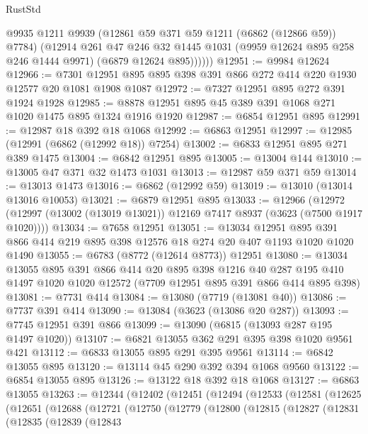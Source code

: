 \begin{lexlean}{RustStd}
\begin{coremodule}
            @9935
            @1211
            @9939
            (@12861 @59 @371 @59 @1211 (@6862 (@12866 @59)) @7784)
            (@12914
              @261
              @47
              @246
              @32
              @1445
              @1031
              (@9959 @12624 @895 @258 @246 @1444 @9971)
              (@6879 @12624 @895))))))
@12951 := @9984 @12624
@12966 := @7301 @12951 @895 @895 @398 @391 @866 @272 @414 @220 @1930 @12577 @20 @1081 @1908 @1087
@12972 := @7327 @12951 @895 @272 @391 @1924 @1928
@12985 := @8878 @12951 @895 @45 @389 @391 @1068 @271 @1020 @1475 @895 @1324 @1916 @1920
@12987 := @6854 @12951 @895
@12991 := @12987 @18 @392 @18 @1068
@12992 := @6863 @12951
@12997 := @12985 (@12991 (@6862 (@12992 @18)) @7254)
@13002 := @6833 @12951 @895 @271 @389 @1475
@13004 := @6842 @12951 @895
@13005 := @13004 @144
@13010 := @13005 @47 @371 @32 @1473 @1031
@13013 := @12987 @59 @371 @59
@13014 := @13013 @1473
@13016 := @6862 (@12992 @59)
@13019 := @13010 (@13014 @13016 @10053)
@13021 := @6879 @12951 @895
@13033 := @12966
    (@12972 (@12997 (@13002 (@13019 @13021)) @12169 @7417 @8937 (@3623 (@7500 @1917 @1020))))
@13034 := @7658 @12951
@13051 := @13034
    @12951
    @895
    @391
    @866
    @414
    @219
    @895
    @398
    @12576
    @18
    @274
    @20
    @407
    @1193
    @1020
    @1020
    @1490
@13055 := @6783 (@8772 (@12614 @8773)) @12951
@13080 := @13034
    @13055
    @895
    @391
    @866
    @414
    @20
    @895
    @398
    @1216
    @40
    @287
    @195
    @410
    @1497
    @1020
    @1020
    @12572
    (@7709 @12951 @895 @391 @866 @414 @895 @398)
@13081 := @7731 @414
@13084 := @13080 (@7719 (@13081 @40))
@13086 := @7737 @391 @414
@13090 := @13084 (@3623 (@13086 @20 @287))
@13093 := @7745 @12951 @391 @866
@13099 := @13090 (@6815 (@13093 @287 @195 @1497 @1020))
@13107 := @6821 @13055 @362 @291 @395 @398 @1020 @9561 @421
@13112 := @6833 @13055 @895 @291 @395 @9561
@13114 := @6842 @13055 @895
@13120 := @13114 @45 @290 @392 @394 @1068 @9560
@13122 := @6854 @13055 @895
@13126 := @13122 @18 @392 @18 @1068
@13127 := @6863 @13055
@13263 := @12344
    (@12402
      (@12451
        (@12494
          (@12533
            (@12581
              (@12625
                (@12651
                  (@12688
                    (@12721
                      (@12750
                        (@12779
                          (@12800
                            (@12815
                              (@12827
                                (@12831
                                  (@12835
                                    (@12839
                                      (@12843

\end{coremodule}
\end{lexlean}
